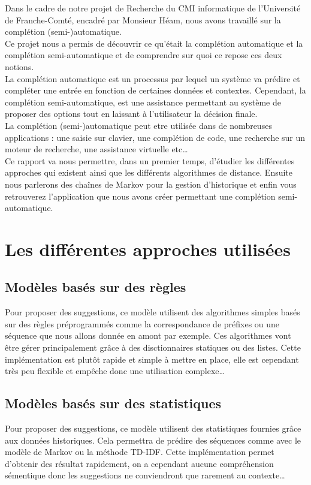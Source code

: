 \documentclass[a4paper, 11pt]{report}
\begin{document}
Dans le cadre de notre projet de Recherche du CMI informatique de l’Université de Franche-Comté, encadré par Monsieur Héam, nous avons travaillé sur la complétion (semi-)automatique. \\

Ce projet nous a permis de découvrir ce qu'était la complétion automatique et la complétion semi-automatique et de comprendre sur quoi ce repose ces deux notions. \\ 
La complétion automatique est un processus par lequel un système va prédire et compléter une entrée en fonction de certaines données et contextes. Cependant, la complétion semi-automatique, est une assistance permettant au système de proposer des options tout en laissant à l'utilisateur la décision finale. \\
La complétion (semi-)automatique peut etre utilisée dans de nombreuses applications : une saisie sur clavier, une complétion de code, une recherche sur un moteur de recherche, une assistance virtuelle etc\dots \\
Ce rapport va nous permettre, dans un premier temps, d’étudier les différentes approches qui existent ainsi que  les différents algorithmes de distance. Ensuite nous parlerons  des chaînes de Markov pour la gestion d'historique et enfin vous retrouverez l'application que nous avons créer permettant une complétion semi-automatique. \\
\vfill

\chapter{Les différentes approches utilisées}

\section{Modèles basés sur des règles}
Pour proposer des suggestions, ce modèle utilisent des algorithmes simples basés sur des règles préprogrammés comme la correspondance de préfixes ou une séquence que nous allons donnée en amont par exemple. Ces algorithmes vont être gérer principalement grâce à des disctionnaires statiques ou des listes.  Cette implémentation est plutôt rapide et simple à mettre en place, elle est cependant très peu flexible et empêche donc une utilisation complexe\dots

\section{Modèles basés sur des statistiques}
Pour proposer des suggestions, ce modèle utilisent des statistiques fournies grâce aux données historiques. Cela permettra de prédire des séquences comme avec le modèle de Markov ou la méthode TD-IDF.
Cette implémentation permet d'obtenir des résultat rapidement, on a cependant aucune compréhension sémentique donc les suggestions ne conviendront que rarement au contexte\dots
\end{document}
